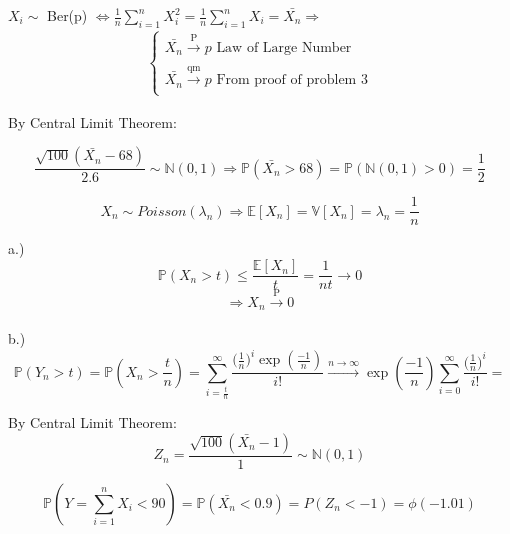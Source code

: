 \documentclass[10pt]{article}
\newenvironment{problem}[2][Problem]{\begin{trivlist}
\item[\hskip \labelsep {\bfseries #1}\hskip \labelsep {\bfseries #2.}]}{\end{trivlist}}
\begin{document}
\begin{problem}{5}

$X_i \sim $ Ber(p) $\Longleftrightarrow \frac{1}{n} \sum_{i=1}^{n} X_i^2=\frac{1}{n} \sum_{i=1}^{n} X_i= \bar{X_n} \Rightarrow$
\begin{align}
    \begin{cases}
        \bar{X_n} \xrightarrow[]{\text{P}} p \text{ Law of Large Number} \\
        \bar{X_n} \xrightarrow[]{\text{qm}} p \text{ From proof of problem 3}        
    \end{cases}
\end{align}

\end{problem}

\begin{problem}{6}

By Central Limit Theorem:

\[\frac{\sqrt{100}(\bar{X_n}-68)}{2.6} \sim \mathbb{N}(0,1) \Longrightarrow \mathbb{P}(\bar{X_n} > 68)= \mathbb{P}(\mathbb{N}(0,1)>0)=\frac{1}{2}\]
\end{problem}

\begin{problem}{7}



\[X_n \sim Poisson(\lambda_n) \Rightarrow \mathbb{E}[X_n]= \mathbb{V}[X_n]= \lambda_n=\frac{1}{n}\]

a.) \\

\[\mathbb{P}(X_n > t) \leqslant \frac{\mathbb{E}[X_n]}{t}=\frac{1}{nt} \rightarrow 0\]
\[ \Rightarrow X_n \xrightarrow[]{\text{P}} 0\]

b.)\\

\[\mathbb{P}(Y_n > t) =\mathbb{P}(X_n > \frac{t}{n})=\sum_{i=\frac{t}{n}}^{\infty}\frac{\big(\frac{1}{n} \big)^i \exp(\frac{-1}{n})}{i!} \xrightarrow[]{n\rightarrow \infty} \exp(\frac{-1}{n})\sum_{i=0}^{\infty}\frac{\big(\frac{1}{n}\big)^i}{i!}= \]
\end{problem}

\begin{problem}{8}



By Central Limit Theorem: 
\[Z_n=\frac{\sqrt{100}(\bar{X_n}-1)}{1} \sim \mathbb{N}(0,1)\]

\[\mathbb{P}(Y=\sum_{i=1}^{n} X_i < 90)= \mathbb{P}(\bar{X_n} < 0.9)= P(Z_n < -1)=\phi (-1.01)\]
\end{problem}
\end{document}
